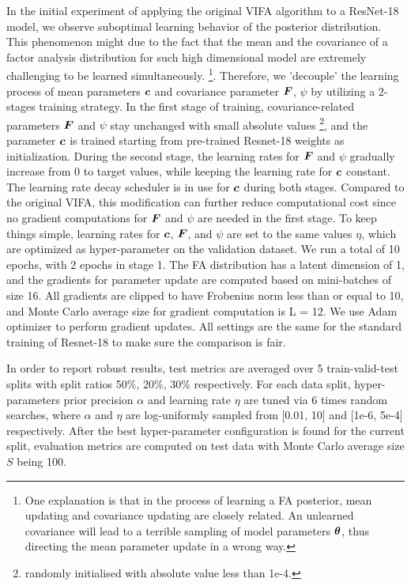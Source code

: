 \documentclass[10pt]{article} %
\begin{document}
In the initial experiment of applying the original VIFA algorithm to a ResNet-18 model, we observe suboptimal learning behavior of the posterior distribution. This phenomenon might due to the fact that the mean and the covariance of a factor analysis distribution for such high dimensional model are extremely challenging to be learned simultaneously.  \footnote{One explanation is that in the process of learning a FA posterior, mean updating and covariance updating are closely related. An unlearned covariance will lead to a terrible sampling of model parameters ${\bm{\theta}}$, thus directing the mean parameter update in a wrong way.}. Therefore, we 'decouple' the learning process of mean parameters ${\bm{c}}$ and covariance parameter ${\bm{F}}$, $\psi$ by utilizing a 2-stages training strategy. In the first stage of training, covariance-related parameters ${\bm{F}}$ and $\psi$ stay unchanged with small absolute values \footnote{randomly initialised with absolute value less than 1e-4.}, and the parameter ${\bm{c}}$ is trained starting from pre-trained Resnet-18 weights as initialization. During the second stage, the learning rates for ${\bm{F}}$ and $\psi$ gradually increase from 0 to target values, while keeping the learning rate for ${\bm{c}}$ constant. The learning rate decay scheduler is in use for ${\bm{c}}$ during both stages. Compared to the original VIFA, this modification can further reduce computational cost since no gradient computations for ${\bm{F}}$ and $\psi$ are needed in the first stage. To keep things simple, learning rates for ${\bm{c}}$, ${\bm{F}}$, and $\psi$ are set to the same values $\eta$, which are optimized as hyper-parameter on the validation dataset. We run a total of 10 epochs, with 2 epochs in stage 1. The FA distribution has a latent dimension of 1, and the gradients for parameter update are computed based on mini-batches of size 16. All gradients are clipped to have Frobenius norm less than or equal to 10, and Monte Carlo average size for gradient computation is L = 12. We use Adam optimizer \citep{kingma2014adam} to perform gradient updates.
All settings are the same for the standard training of Resnet-18 to make sure the comparison is fair.

In order to report robust results, test metrics are averaged over 5 train-valid-test splits with split ratios  50\%, 20\%, 30\% respectively. For each data split, hyper-parameters prior precision $\alpha$ and learning rate $\eta$ are tuned via 6 times random searches, where $\alpha$ and $\eta$ are log-uniformly sampled from [0.01, 10] and [1e-6, 5e-4] respectively. After the best hyper-parameter configuration is found for the current split, evaluation metrics are computed on test data with Monte Carlo average size $S$ being 100.
\end{document}
